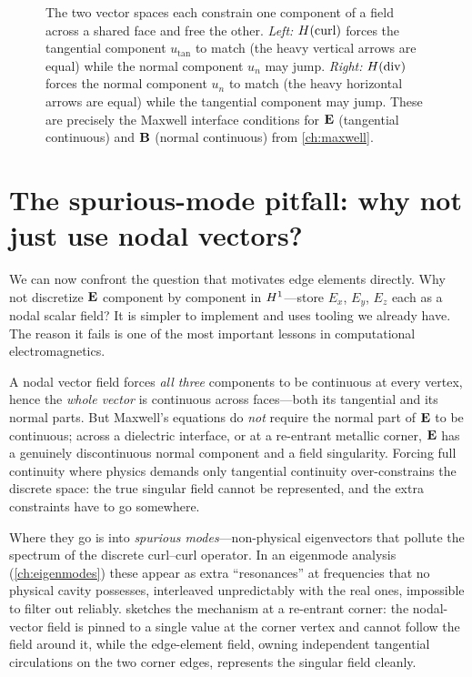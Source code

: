 \begin{figure}[t]
\caption[Tangential versus normal continuity]{The two vector spaces each constrain one
component of a field across a shared face and free the other. \emph{Left:} $H(\mathrm{curl})$
forces the tangential component $u_{\text{tan}}$ to match (the heavy vertical arrows are
equal) while the normal component $u_n$ may jump. \emph{Right:} $H(\mathrm{div})$ forces the
normal component $u_n$ to match (the heavy horizontal arrows are equal) while the
tangential component may jump. These are precisely the Maxwell interface conditions for
$\mathbf{E}$ (tangential continuous) and $\mathbf{B}$ (normal continuous) from \cref{ch:maxwell}.}
\label{fig:tangnormal}
\end{figure}

\section{The spurious-mode pitfall: why not just use nodal vectors?}
\label{sec:spurious}

We can now confront the question that motivates edge elements directly. Why not
discretize $\mathbf{E}$ component by component in $H^1$---store $E_x$, $E_y$, $E_z$ each as a
nodal scalar field? It is simpler to implement and uses tooling we already have. The
reason it fails is one of the most important lessons in computational electromagnetics.

A nodal vector field forces \emph{all three} components to be continuous at every
vertex, hence the \emph{whole vector} is continuous across faces---both its tangential
and its normal parts. But Maxwell's equations do \emph{not} require the normal part of
$\mathbf{E}$ to be continuous; across a dielectric interface, or at a re-entrant metallic
corner, $\mathbf{E}$ has a genuinely discontinuous normal component and a field singularity.
Forcing full continuity where physics demands only tangential continuity over-constrains
the discrete space: the true singular field cannot be represented, and the extra
constraints have to go somewhere.

Where they go is into \emph{spurious modes}---non-physical eigenvectors that pollute the
spectrum of the discrete curl--curl operator. In an eigenmode analysis
(\cref{ch:eigenmodes}) these appear as extra ``resonances'' at frequencies that no
physical cavity possesses, interleaved unpredictably with the real ones, impossible to
filter out reliably.  sketches the mechanism at a re-entrant corner:
the nodal-vector field is pinned to a single value at the corner vertex and cannot
follow the field around it, while the edge-element field, owning independent tangential
circulations on the two corner edges, represents the singular field cleanly.

